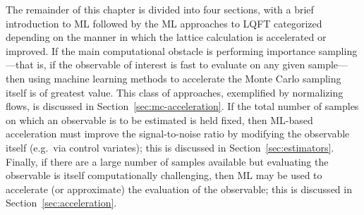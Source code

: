 \documentclass[12pt]{article}
\begin{document}
\begin{table}
\begin{center}

\end{center}
\caption{\label{tab:classification} Classification of some ML applications to LQFT based on the part of the computational pipeline that is targeted, and the approach to maintaining exactness. Table is not exhaustive.}

\end{table}

The remainder of this chapter is divided into four sections, with a brief introduction to ML followed by the ML approaches to LQFT categorized depending on the manner in which the lattice calculation is accelerated or improved. If the main computational obstacle is performing importance sampling---that is, if the observable of interest is fast to evaluate on any given sample---then using machine learning methods to accelerate the Monte Carlo sampling itself is of greatest value. This class of approaches, exemplified by normalizing flows, is discussed in Section~\ref{sec:mc-acceleration}. If the total number of samples on which an observable is to be estimated is held fixed, then ML-based acceleration must improve the signal-to-noise ratio by modifying the observable itself (e.g.~via control variates); this is discussed in Section~\ref{sec:estimators}. Finally, if there are a large number of samples available but evaluating the observable is itself computationally challenging, then ML may be used to accelerate (or approximate) the evaluation of the observable; this is discussed in Section~\ref{sec:acceleration}.
\end{document}
